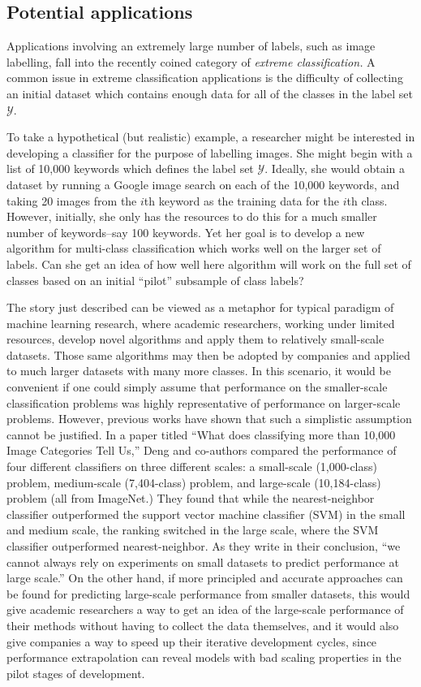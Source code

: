 \documentclass[12pt]{article}
\begin{document}
\subsection{Potential applications}


Applications involving an extremely large number of labels, such as
image labelling, fall into the recently coined category
of \emph{extreme classification.}  A common issue in extreme
classification applications is the difficulty of collecting an initial
dataset which contains enough data for all of the classes in the label
set $\mathcal{Y}$.

To take a hypothetical (but realistic) example, a researcher might be
interested in developing a classifier for the purpose of labelling
images.  She might begin with a list of 10,000 keywords which defines
the label set $\mathcal{Y}$.  Ideally, she would obtain a dataset by
running a Google image search on each of the 10,000 keywords, and
taking 20 images from the $i$th keyword as the training data for the
$i$th class.  However, initially, she only has the resources to do
this for a much smaller number of keywords--say 100 keywords.  Yet her
goal is to develop a new algorithm for multi-class classification
which works well on the larger set of labels.  Can she get an idea of
how well here algorithm will work on the full set of classes based on
an initial ``pilot'' subsample of class labels?

The story just described can be viewed as a metaphor for typical
paradigm of machine learning research, where academic researchers,
working under limited resources, develop novel algorithms and apply
them to relatively small-scale datasets.  Those same algorithms may
then be adopted by companies and applied to much larger datasets with
many more classes.  In this scenario, it would be convenient if one
could simply assume that performance on the smaller-scale
classification problems was highly representative of performance on
larger-scale problems.  However, previous works have shown that such a
simplistic assumption cannot be justified.  In a paper titled ``What
does classifying more than 10,000 Image Categories Tell Us,'' Deng and
co-authors compared the performance of four different classifiers on
three different scales: a small-scale (1,000-class) problem,
medium-scale (7,404-class) problem, and large-scale (10,184-class)
problem (all from ImageNet.)  They found that while the
nearest-neighbor classifier outperformed the support vector machine
classifier (SVM) in the small and medium scale, the ranking switched
in the large scale, where the SVM classifier outperformed
nearest-neighbor.  As they write in their conclusion, ``we cannot
always rely on experiments on small datasets to predict performance at
large scale.''  On the other hand, if more principled and accurate
approaches can be found for predicting large-scale performance from
smaller datasets, this would give academic researchers a way to get an
idea of the large-scale performance of their methods without having to
collect the data themselves, and it would also give companies a way to
speed up their iterative development cycles, since performance
extrapolation can reveal models with bad scaling properties in the
pilot stages of development.
\end{document}
